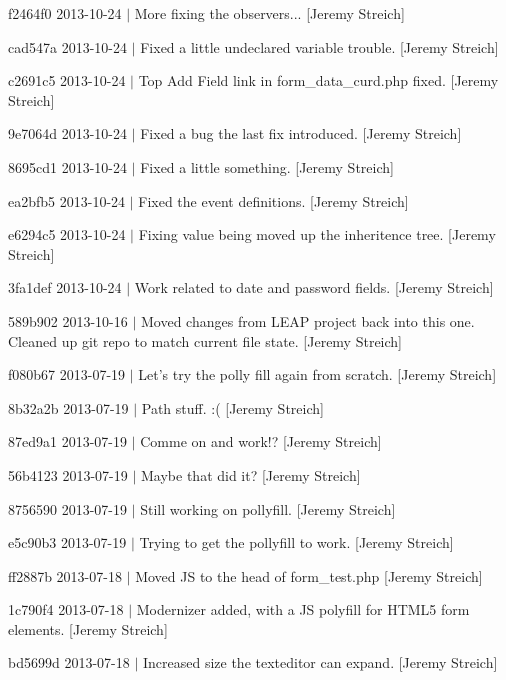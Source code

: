 \begin{DoxyItemize}
\item f2464f0 2013-\/10-\/24 $|$ More fixing the observers... \mbox{[}Jeremy Streich\mbox{]}
\item cad547a 2013-\/10-\/24 $|$ Fixed a little undeclared variable trouble. \mbox{[}Jeremy Streich\mbox{]}
\item c2691c5 2013-\/10-\/24 $|$ Top Add Field link in form\-\_\-data\-\_\-curd.\-php fixed. \mbox{[}Jeremy Streich\mbox{]}
\item 9e7064d 2013-\/10-\/24 $|$ Fixed a bug the last fix introduced. \mbox{[}Jeremy Streich\mbox{]}
\item 8695cd1 2013-\/10-\/24 $|$ Fixed a little something. \mbox{[}Jeremy Streich\mbox{]}
\item ea2bfb5 2013-\/10-\/24 $|$ Fixed the event definitions. \mbox{[}Jeremy Streich\mbox{]}
\item e6294c5 2013-\/10-\/24 $|$ Fixing value being moved up the inheritence tree. \mbox{[}Jeremy Streich\mbox{]}
\item 3fa1def 2013-\/10-\/24 $|$ Work related to date and password fields. \mbox{[}Jeremy Streich\mbox{]}
\item 589b902 2013-\/10-\/16 $|$ Moved changes from L\-E\-A\-P project back into this one. Cleaned up git repo to match current file state. \mbox{[}Jeremy Streich\mbox{]}
\item f080b67 2013-\/07-\/19 $|$ Let's try the polly fill again from scratch. \mbox{[}Jeremy Streich\mbox{]}
\item 8b32a2b 2013-\/07-\/19 $|$ Path stuff. \-:( \mbox{[}Jeremy Streich\mbox{]}
\item 87ed9a1 2013-\/07-\/19 $|$ Comme on and work!? \mbox{[}Jeremy Streich\mbox{]}
\item 56b4123 2013-\/07-\/19 $|$ Maybe that did it? \mbox{[}Jeremy Streich\mbox{]}
\item 8756590 2013-\/07-\/19 $|$ Still working on pollyfill. \mbox{[}Jeremy Streich\mbox{]}
\item e5c90b3 2013-\/07-\/19 $|$ Trying to get the pollyfill to work. \mbox{[}Jeremy Streich\mbox{]}
\item ff2887b 2013-\/07-\/18 $|$ Moved J\-S to the head of form\-\_\-test.\-php \mbox{[}Jeremy Streich\mbox{]}
\item 1c790f4 2013-\/07-\/18 $|$ Modernizer added, with a J\-S polyfill for H\-T\-M\-L5 form elements. \mbox{[}Jeremy Streich\mbox{]}
\item bd5699d 2013-\/07-\/18 $|$ Increased size the texteditor can expand. \mbox{[}Jeremy Streich\mbox{]}

\end{DoxyItemize}
